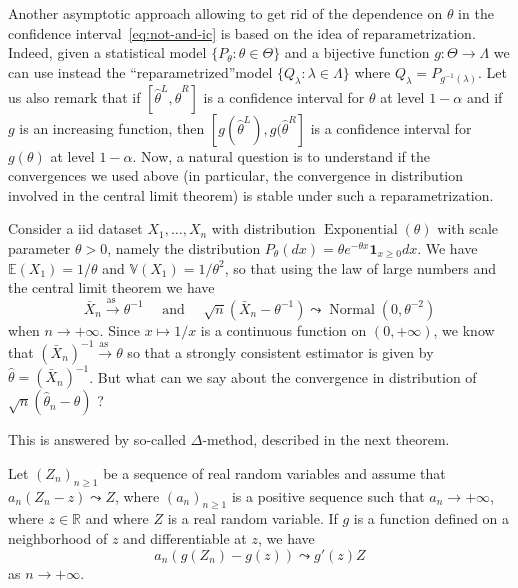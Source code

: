 \documentclass[
	fontsize=11pt, %
	twoside=false, %
	numbers=noenddot, %
]{kaobook}
\DeclareMathOperator{\nor}{Normal}
\DeclareMathOperator{\expo}{Exponential}
\newcommand{\E}{\mathbb E}
\newcommand{\R}{\mathbb R}
\newcommand{\var}{\mathbb V}
\newcommand{\wh}{\widehat}
\newcommand{\ind}[1]{\mathbf 1_{#1}}
\newcommand{\goes}{\rightarrow}
\newcommand{\goas}{\overset{\text{as\ }}{\rightarrow}}
\begin{document}
Another asymptotic approach allowing to get rid of the dependence on $\theta$ in the confidence interval~\eqref{eq:not-and-ic} is based on the idea of reparametrization.
Indeed, given a statistical model $\{ P_\theta : \theta \in \Theta \}$ and a bijective function $g : \Theta \goes \Lambda$ we can use instead the ``reparametrized''model $\{ Q_\lambda : \lambda \in \Lambda \}$ where $Q_\lambda = P_{g^{-1}(\lambda)}$.
Let us also remark that if $[\wh \theta^L, \wh \theta^R]$ is a confidence interval for $\theta$ at level $1 - \alpha$ and if $g$ is an increasing function, then 
$[g(\wh \theta^L), g(\wh \theta^R]$ is a confidence interval for $g(\theta)$ at level $1 - \alpha$.
Now, a natural question is to understand if the convergences we used above (in particular, the convergence in distribution involved in the central limit theorem) is stable under such a reparametrization.
\begin{example}
	\label{ex:expo}
	Consider a iid dataset $X_1, \ldots, X_n$ with distribution $\expo(\theta)$ with scale parameter $\theta > 0$, namely the distribution $P_\theta(dx) = \theta e^{-\theta x} \ind{x \geq 0} dx$. 
	We have $\E(X_1) = 1 / \theta$ and $\var(X_1) = 1 / \theta^2$, so that using the law of large numbers and the central limit theorem we have
	\begin{equation*}
		\bar X_n \goas \theta^{-1} \quad \text{ and } \quad \sqrt n (\bar X_n - \theta^{-1}) \leadsto \nor(0, \theta^{-2})
	\end{equation*}
	when $n \rightarrow +\infty$.
	Since $x \mapsto 1 / x$ is a continuous function on $(0, +\infty)$, we know that $(\bar X_n)^{-1} \goas \theta$ so that a strongly consistent estimator is given by $\wh \theta = (\bar X_n)^{-1}$.
	But what can we say about the convergence in distribution of 
	$\sqrt n (\wh \theta_n - \theta)$ ?
\end{example}
This is answered by so-called $\Delta$-method, described in the next theorem.
\begin{theorem}
	\label{thm:delta-method}
 	Let $(Z_n)_{n \geq 1}$ be a sequence of real random variables and assume that 
	$a_n(Z_n - z) \leadsto Z$, where $(a_n)_{n \geq 1}$ is a positive sequence such that $a_n \goes +\infty$, where $z \in \R$ and where $Z$ is a real random variable.
 	If $g$ is a function defined on a neighborhood of $z$ and differentiable at $z$, we have 
 	\begin{equation}
 		a_n (g(Z_n) - g(z)) \leadsto g'(z) Z
 	\end{equation}
 	as $n \goes +\infty$.
\end{theorem}
\end{document}

